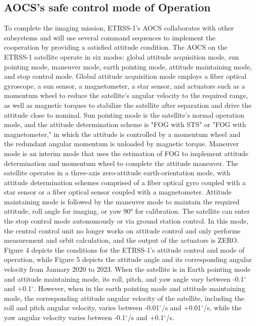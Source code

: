 \documentclass[final,5p,times,twocolumn]{elsarticle}
\begin{document}
\subsection{AOCS's safe control mode of Operation}
To complete the imaging mission, ETRSS-1's AOCS collaborates with other subsystems and will use several command sequences to implement the cooperation by providing a satisfied attitude condition. The AOCS on the ETRSS-1 satellite operate in six modes: global attitude acquisition mode, sun pointing mode, maneuver mode, earth pointing mode, attitude maintaining mode, and stop control mode.
Global attitude acquisition mode employs a fiber optical gyroscope, a sun sensor, a magnetometer, a star sensor, and actuators such as a momentum wheel to reduce the satellite's angular velocity to the required range, as well as magnetic torques to stabilize the satellite after separation and drive the attitude close to nominal. Sun pointing mode is the satellite's normal operation mode, and the attitude determination scheme is "FOG with STS" or "FOG with magnetometer," in which the attitude is controlled by a momentum wheel and the redundant angular momentum is unloaded by magnetic torque. Maneuver mode is an interim mode that uses the estimation of FOG to implement attitude determination and momentum wheel to complete the attitude maneuver. The satellite operates in a three-axis zero-attitude earth-orientation mode, with attitude determination schemes comprised of a fiber optical gyro coupled with a star sensor or a fiber optical sensor coupled with a magnetometer. Attitude maintaining mode is followed by the maneuver mode to maintain the required attitude, roll angle for imaging, or yaw 90° for calibration. The satellite can enter the stop control mode autonomously or via ground station control. In this mode, the central control unit no longer works on attitude control and only performs measurement and orbit calculation, and the output of the actuators is ZERO. Figure 4 depicts the conditions for the ETRSS-1's attitude control and mode of operation, while Figure 5 depicts the attitude angle and its corresponding angular velocity from January 2020 to 2023. When the satellite is in Earth pointing mode and attitude maintaining mode, its roll, pitch, and yaw angle vary between -0.1$^{\circ}$ and +0.1$^{\circ}$. However, when in the earth pointing mode and attitude maintaining mode, the corresponding attitude angular velocity of the satellite, including the roll and pitch angular velocity, varies between -0.01$^{\circ}$/s and +0.01$^{\circ}$/s, while the yaw angular velocity varies between -0.1$^{\circ}$/s and +0.1$^{\circ}$/s.
\end{document}
